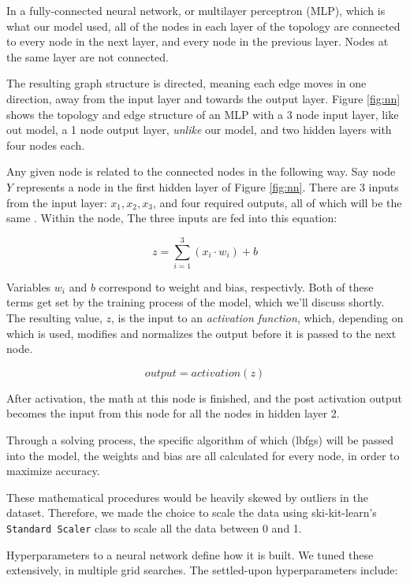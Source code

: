 \documentclass[10pt,sigconf,letterpaper,nonacm]{acmart}
\begin{document}
In a fully-connected neural network, or multilayer perceptron (MLP), which is what our model used, all of the nodes in each layer of the topology are connected to every node in the next layer, and every node in the previous layer. Nodes at the same layer are not connected.

The resulting graph structure is directed, meaning each edge moves in one direction, away from the input layer and towards the output layer. Figure 
\ref{fig:nn}
shows the topology and edge structure of an MLP with a 3 node input layer, like out model, a 1 node output layer, {\it unlike} our model, and two hidden layers with four nodes each.

Any given node is related to the connected nodes in the following way.
Say node $Y$ represents a node in the first hidden layer of Figure \ref{fig:nn}.
There are 3 inputs from the input layer: $x_1, x_2, x_3$, and four required outputs, all of which will be the same . Within the node, The three inputs are fed into this equation:

$$z = \sum_{i=1}^3(x_i \cdot w_i) + b$$

Variables $w_i$ and $b$ correspond to weight and bias, respectivly. Both of these terms get set by the training process of the model, which we'll discuss shortly. 
The resulting value, $z$, is the input to an {\it activation function}, which, depending on which is used, modifies and normalizes the output before it is passed to the next node. 

$$output = activation(z)$$

After activation, the math at this node is finished, and the post activation output becomes the input from this node for all the nodes in hidden layer 2.

Through a solving process, the specific algorithm of which (lbfgs) will be passed into the model, 
the weights and bias are all calculated for every node, in order to maximize accuracy.

These mathematical procedures would be heavily skewed by outliers in the dataset. Therefore, we made the choice to scale the data using ski-kit-learn's \texttt{Standard Scaler} class to scale all the data between 0 and 1.

Hyperparameters to a neural network define how it is built. We tuned these extensively, in multiple grid searches. The settled-upon hyperparameters include:
\end{document}
